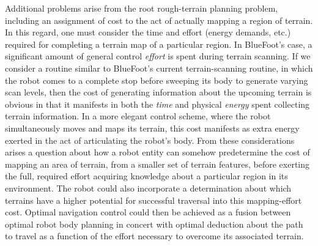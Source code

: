 Additional problems arise from the root rough-terrain planning problem, including an assignment of cost to the act of actually mapping a region of terrain. In this regard, one must consider the time and effort (energy demands, etc.) required for completing a terrain map of a particular region. In BlueFoot's case, a significant amount of general control \emph{effort} is spent during terrain scanning. If we consider a routine similar to BlueFoot's current terrain-scanning routine, in which the robot comes to a complete stop before sweeping its body to generate varying scan levels, then the cost of generating information about the upcoming terrain is obvious in that it manifests in both the \emph{time} and physical \emph{energy} spent collecting terrain information. In a more elegant control scheme, where the robot simultaneously moves and maps its terrain, this cost manifests as extra energy exerted in the act of articulating the robot's body. From these considerations arises a question about how a robot entity can somehow predetermine the cost of mapping an area of terrain, from a smaller set of terrain features, before exerting the full, required effort acquiring knowledge about a particular region in its environment. The robot could also incorporate a determination about which terrains have a higher potential for successful traversal into this mapping-effort cost. Optimal navigation control could then be achieved as a fusion between optimal robot body planning in concert with optimal deduction about the path to travel as a function of the effort necessary to overcome its associated terrain.